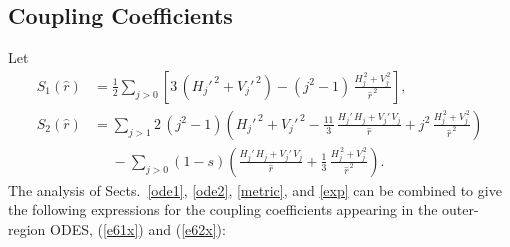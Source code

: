 \documentclass[12pt,prb,aps]{revtex4-1}
\begin{document}
\subsection{Coupling Coefficients}
Let
\begin{align}
S_1(\hat{r})&= \frac{1}{2}\sum_{j>0}\left[3\,(H_j'^{\,2}+V_j'^{\,2}) - (j^2-1)\,\frac{H_j^{\,2}+V_j^{\,2}}{\hat{r}^{\,2}}\right],\\[0.5ex]
S_2(\hat{r})&= \sum_{j>1}2\,(j^2-1)\left(H_j'^{\,2}+V_j'^{\,2}-\frac{11}{3}\,\frac{H_j'\,H_j+V_j'\,V_j}{\hat{r}}+j^2\,\frac{H_j^{\,2}+V_j^{\,2}}{\hat{r}^{\,2}}\right)\nonumber\\[0.5ex]&\phantom{=} -\sum_{j>0}(1-s)\left(\frac{H_j'\,H_j+V_j'\,V_j}{\hat{r}}+\frac{1}{3}\,\frac{H_j^{\,2}+V_j^{\,2}}{\hat{r}^{\,2}}\right).
\end{align}
The analysis of Sects.~\ref{ode1}, \ref{ode2}, \ref{metric}, and \ref{exp} can be combined to give
the following expressions for the coupling coefficients appearing in the outer-region ODES, (\ref{e61x}) and (\ref{e62x}):\,\cite{am1}
\end{document}
